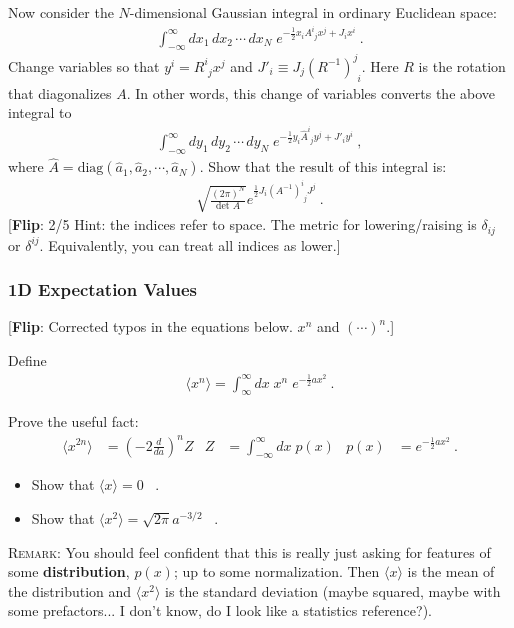 \documentclass[12pt]{article}
\newcommand{\flip}[1]{{\color{red} [\textbf{Flip}: {#1}]}}
\begin{document}
Now consider the $N$-dimensional Gaussian integral in ordinary Euclidean space:
\begin{align}
	\int_{-\infty}^\infty
	dx_1 \, dx_2 \, \cdots \, dx_N \;
	e^{-\frac 12 x_i  A^i_{\phantom{i}j} x^j  + J_i x^i} \ .
\end{align}
Change variables so that $y^i = R^i_{\phantom{i}j}  x^j$ and $J'_i \equiv J_j(R^{-1})^j_{\phantom{j}i}$. Here $R$ is the rotation that diagonalizes $A$. In other words, this change of variables converts the above integral to
\begin{align}
	\int_{-\infty}^\infty
	dy_1 \, dy_2 \, \cdots \, dy_N \;
	e^{-\frac 12 y_i \hat{A}^i_{\phantom{i}j}  y^j  + J'_i y^i} \ ,
\end{align}
where $\hat A = \text{diag}(\hat a_1, \hat a_2, \cdots, \hat a_N)$. Show that the result of this integral is:
\begin{align}
	\sqrt{\frac{(2\pi)^N}{\text{det }A}} e^{\frac 12 J_i (A^{-1})^i_{\phantom{i}j} J^j} \ .
\end{align}
\flip{2/5 Hint: the indices refer to space. The metric for lowering/raising is $\delta_{ij}$ or $\delta^{ij}$. Equivalently, you can treat all indices as lower.}

\subsubsection{1D Expectation Values}

\flip{Corrected typos in the equations below. $x^n$ and $(\cdots)^n$.}

Define
\begin{align}
	\langle x^n \rangle = \int_{\infty}^\infty dx \; x^n \; e^{-\frac 12 ax^2} \ .
\end{align}

Prove the useful fact:
\begin{align}
	\langle x^{2n} \rangle &= \left(-2\frac{d}{da}\right)^n Z
	& 
	Z &= \int_{-\infty}^\infty dx\; p(x) 
	&
	p(x) &=  e^{-\frac 12 ax^2}\ .
\end{align}


\begin{itemize}
	\item Show that $\langle x\rangle = 0$ \ .
	\item Show that $\langle x^2\rangle = \sqrt{2\pi} a^{-3/2}$ \ .
\end{itemize}

\textsc{Remark}: You should feel confident that this is really just asking for features of some \textbf{distribution}, $p(x)$; up to some normalization. Then $\langle x \rangle$ is the mean of the distribution and $\langle x^2 \rangle$ is the standard deviation (maybe squared, maybe with some prefactors... I don't know, do I look like a statistics reference?).  
\end{document}
